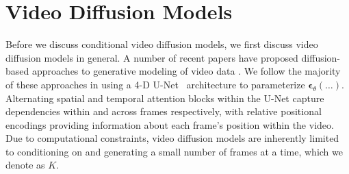 \section{Video Diffusion Models}
Before we discuss conditional video diffusion models, we first discuss video diffusion models in general. A number of recent papers have proposed diffusion-based approaches to generative modeling of video data \citep{didrik, fdm, vdm, yang2022diffusion, voleti2022MCVD}. 
We follow the majority of these approaches \citep{fdm,vdm,voleti2022MCVD} in using a 4-D U-Net~\citep{unet} architecture to parameterize $\boldsymbol{\epsilon}_\theta(\ldots)$. 
Alternating spatial and temporal attention blocks within the U-Net capture dependencies within and across frames respectively, with relative positional encodings \citep{rpe1, rpe2} providing information about each frame's position within the video. 
Due to computational constraints, video diffusion models are inherently limited to conditioning on and generating a small number of frames at a time, which we denote as $K$. 

